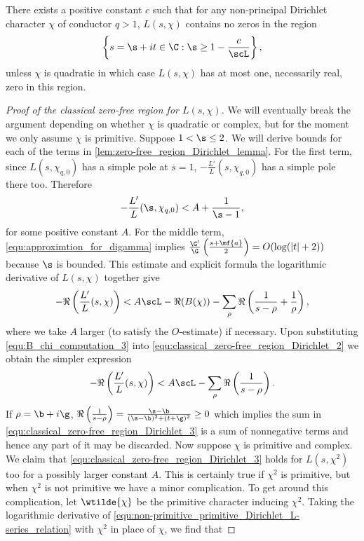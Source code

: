       \begin{theorem}
        There exists a positive constant $c$ such that for any non-principal Dirichlet character $\chi$ of conductor $q > 1$, $L(s,\chi)$ contains no zeros in the region
        \[
          \left\{s = \s+it \in \C:\s \ge 1-\frac{c}{\scL}\right\},
        \]
        unless $\chi$ is quadratic in which case $L(s,\chi)$ has at most one, necessarily real, zero in this region.
      \end{theorem}
      \begin{proof}[Proof of the classical zero-free region for $L(s,\chi)$]
        We will eventually break the argument depending on whether $\chi$ is quadratic or complex, but for the moment we only assume $\chi$ is primitive. Suppose $1 < \s \le 2$. We will derive bounds for each of the terms in \cref{lem:zero-free_region_Dirichlet_lemma}. For the first term, since $L(s,\chi_{q,0})$ has a simple pole at $s = 1$, $-\frac{L'}{L}(s,\chi_{q,0})$ has a simple pole there too. Therefore
        \begin{equation}\label{equ:classical_zero-free_region_Dirichlet_1}
          -\frac{L'}{L}(\s,\chi_{q,0}) < A+\frac{1}{\s-1},
        \end{equation}
        for some positive constant $A$. For the middle term, \cref{equ:approximtion_for_digamma} implies $\frac{\G'}{\G}\left(\frac{s+\mf{a}}{2}\right) = O(\log(|t|+2))$ because $\s$ is bounded. This estimate and explicit formula the logarithmic derivative of $L(s,\chi)$ together give
        \begin{equation}\label{equ:classical_zero-free_region_Dirichlet_2}
          -\Re\left(\frac{L'}{L}(s,\chi)\right) < A\scL-\Re(B(\chi))-\sum_{\rho}\Re\left(\frac{1}{s-\rho}+\frac{1}{\rho}\right),
        \end{equation}
        where we take $A$ larger (to satisfy the $O$-estimate) if necessary. Upon substituting \cref{equ:B_chi_computation_3} into \cref{equ:classical_zero-free_region_Dirichlet_2} we obtain the simpler expression
        \begin{equation}\label{equ:classical_zero-free_region_Dirichlet_3}
          -\Re\left(\frac{L'}{L}(s,\chi)\right) < A\scL-\sum_{\rho}\Re\left(\frac{1}{s-\rho}\right).
        \end{equation}
        If $\rho = \b+i\g$, $\Re\left(\frac{1}{s-\rho}\right) = \frac{\s-\b}{(\s-\b)^{2}+(t+\g)^{2}} \ge 0$ which implies the sum in \cref{equ:classical_zero-free_region_Dirichlet_3} is a sum of nonnegative terms and hence any part of it may be discarded. Now suppose $\chi$ is primitive and complex. We claim that \cref{equ:classical_zero-free_region_Dirichlet_3} holds for $L(s,\chi^{2})$ too for a possibly larger constant $A$. This is certainly true if $\chi^{2}$ is primitive, but when $\chi^{2}$ is not primitive we have a minor complication. To get around this complication, let $\wtilde{\chi}$ be the primitive character inducing $\chi^{2}$. Taking the logarithmic derivative of \cref{equ:non-primitive_primitive_Dirichlet_L-series_relation} with $\chi^{2}$ in place of $\chi$, we find that

\end{proof}
